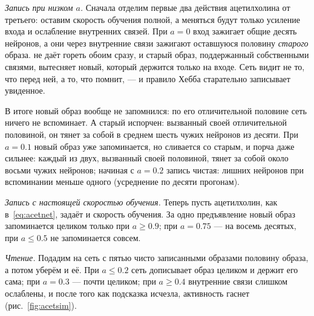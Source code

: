 \emph{Запись при низком $a$.} Сначала отделим первые два действия ацетилхолина от третьего: оставим скорость обучения полной, а меняться будут только усиление входа и ослабление внутренних связей. При $a=0$ вход зажигает общие десять нейронов, а они через внутренние связи зажигают оставшуюся половину \emph{старого} образа.  не даёт гореть обоим сразу, и старый образ, поддержанный собственными связями, вытесняет новый, который держится только на входе. Сеть видит не то, что перед ней, а то, что помнит, --- и правило Хебба старательно записывает увиденное.

В итоге новый образ вообще не запомнился: по его отличительной половине сеть ничего не вспоминает. А старый испорчен: вызванный своей отличительной половиной, он тянет за собой в среднем шесть чужих нейронов из десяти. При $a=0.1$ новый образ уже запоминается, но сливается со старым, и порча даже сильнее: каждый из двух, вызванный своей половиной, тянет за собой около восьми чужих нейронов; начиная с $a=0.2$ запись чистая: лишних нейронов при вспоминании меньше одного (усреднение по десяти прогонам).

\emph{Запись с настоящей скоростью обучения.} Теперь пусть ацетилхолин, как в~\eqref{eq:acetnet}, задаёт и скорость обучения. За одно предъявление новый образ запоминается целиком только при $a\ge0.9$; при $a=0.75$ --- на восемь десятых, при $a\le0.5$ не запоминается совсем.

\emph{Чтение.} Подадим на сеть с пятью чисто записанными образами половину образа, а потом уберём и её. При $a\le0.2$ сеть дописывает образ целиком и держит его сама; при $a=0.3$ --- почти целиком; при $a\ge0.4$ внутренние связи слишком ослаблены, и после того как подсказка исчезла, активность гаснет (рис.~\ref{fig:acetsim}).

